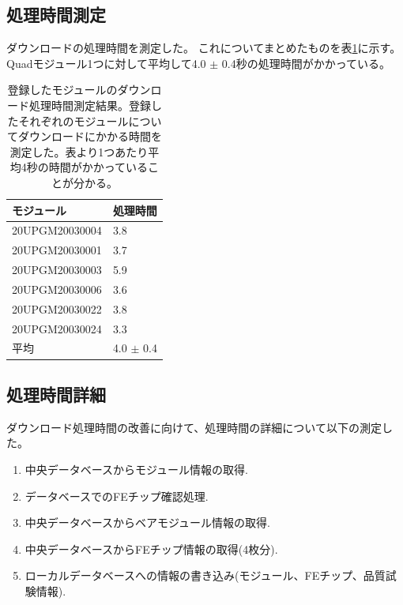\clearpage
\subsection{処理時間測定}
ダウンロードの処理時間を測定した。
これについてまとめたものを表\ref{download_measurement}に示す。
Quadモジュール1つに対して平均して4.0 $\pm$ 0.4秒の処理時間がかかっている。

\begin{table}[tbp]
\begin{center}
\caption[登録したモジュールのダウンロード処理時間測定結果]{登録したモジュールのダウンロード処理時間測定結果。登録したそれぞれのモジュールについてダウンロードにかかる時間を測定した。表より1つあたり平均4秒の時間がかかっていることが分かる。}
\label{download_measurement}
  \begin{tabular}{|ll|} \hline
    モジュール & 処理時間 \\ \hline
    20UPGM20030004 &  3.8 \\ 
    20UPGM20030001 &  3.7 \\ 
    20UPGM20030003 &  5.9 \\ 
    20UPGM20030006 &  3.6 \\ 
    20UPGM20030022 &  3.8 \\ 
    20UPGM20030024 &  3.3 \\ \hline 
    平均           &  4.0 $\pm$ 0.4 \\\hline
  \end{tabular}
\end{center}
\end{table}

\subsection{処理時間詳細}
ダウンロード処理時間の改善に向けて、処理時間の詳細について以下の測定した。
\begin{enumerate}
  \item 中央データベースからモジュール情報の取得.
  \item データベースでのFEチップ確認処理.
  \item 中央データベースからベアモジュール情報の取得.
  \item 中央データベースからFEチップ情報の取得(4枚分).
  \item ローカルデータベースへの情報の書き込み(モジュール、FEチップ、品質試験情報).
\end{enumerate}

